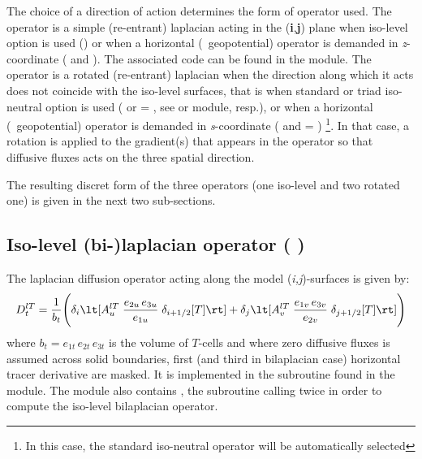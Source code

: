 \documentclass[../main/NEMO_manual]{subfiles}
\begin{document}
The choice of a direction of action determines the form of operator used.
The operator is a simple (re-entrant) laplacian acting in the (\textbf{i},\textbf{j}) plane when
iso-level option is used () or when
a horizontal (\ie\ geopotential) operator is demanded in \textit{z}-coordinate
( and ).
The associated code can be found in the  module.
The operator is a rotated (re-entrant) laplacian when
the direction along which it acts does not coincide with the iso-level surfaces,
that is when standard or triad iso-neutral option is used
( or  = ,
see  or  module, resp.), or
when a horizontal (\ie\ geopotential) operator is demanded in \textit{s}-coordinate
( and  = ) \footnote{
  In this case, the standard iso-neutral operator will be automatically selected}.
In that case, a rotation is applied to the gradient(s) that appears in the operator so that
diffusive fluxes acts on the three spatial direction.

The resulting discret form of the three operators (one iso-level and two rotated one) is given in
the next two sub-sections.

\subsection[Iso-level (bi-)laplacian operator (\forcode{ln_traldf_iso})]{Iso-level (bi-)laplacian operator ( \protect{})}
\label{subsec:TRA_ldf_lev}

The laplacian diffusion operator acting along the model (\textit{i,j})-surfaces is given by:
\begin{equation}
  \label{eq:TRA_ldf_lap}
  D_t^{lT} = \frac{1}{b_t} \Bigg(   \delta_{i} \lt[ A_u^{lT} \; \frac{e_{2u} \, e_{3u}}{e_{1u}} \; \delta_{i + 1/2} [T] \rt]
                                  + \delta_{j} \lt[ A_v^{lT} \; \frac{e_{1v} \, e_{3v}}{e_{2v}} \; \delta_{j + 1/2} [T] \rt] \Bigg)
\end{equation}
where $b_t = e_{1t} \, e_{2t} \, e_{3t}$  is the volume of $T$-cells and
where zero diffusive fluxes is assumed across solid boundaries,
first (and third in bilaplacian case) horizontal tracer derivative are masked.
It is implemented in the  subroutine found in the  module.
The module also contains ,
the subroutine calling twice  in order to
compute the iso-level bilaplacian operator.
\end{document}
